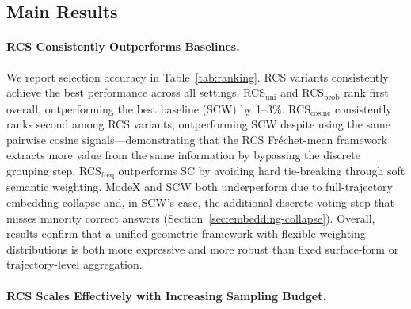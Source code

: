 
\subsection{Main Results}

\paragraph{RCS Consistently Outperforms Baselines.}

We report selection accuracy in Table~\ref{tab:ranking}. RCS variants consistently achieve the best performance across all settings. RCS$_\text{uni}$ and RCS$_\text{prob}$ rank first overall, outperforming the best baseline (SCW) by 1--3\%. 
RCS$_\text{cosine}$ consistently ranks second among RCS variants, outperforming SCW despite using the same pairwise cosine signals---demonstrating that the RCS Fréchet-mean framework extracts more value from the same information by bypassing the discrete grouping step. 
RCS$_\text{freq}$ outperforms SC by avoiding hard tie-breaking through soft semantic weighting.
ModeX and SCW both underperform due to full-trajectory embedding collapse and, in SCW's case, the additional discrete-voting step that misses minority correct answers (Section~\ref{sec:embedding-collapse}).
Overall, results confirm that a unified geometric framework with flexible weighting distributions is both more expressive and more robust than fixed surface-form or trajectory-level aggregation.

\paragraph{RCS Scales Effectively with Increasing Sampling Budget.}\label{sec:scaling}

